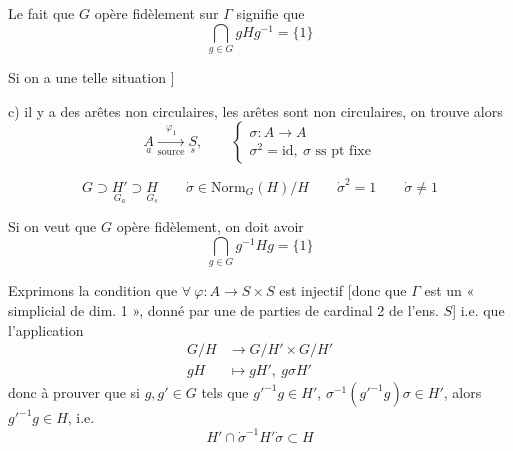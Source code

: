 \documentclass[11pt,a4paper]{article}
\begin{document}
Le fait que $G$ opère fidèlement sur $\Gamma$ signifie que
\[
\bigcap_{g \in G} g H g^{-1} = \{1\}
\]

Si on a une telle situation ]


c)  il y a des arêtes non circulaires, 
les arêtes sont non circulaires, on trouve alors
\[
\underset{a}{A} \xrightarrow[\text{source}]{\ \varphi_1\ } \underset{s}{S}, \qquad
\left\{
\begin{array}{l}
\sigma : A \to A \\
\sigma^2 = \mathrm{id},\ \sigma \text{ ss pt fixe}
\end{array}
\right.
\]

\[
\boxed{G \supset \underset{G_a}{H'} \supset \underset{G_s}{H} \qquad
\dot{\sigma} \in \mathrm{Norm}_G(H)/H \qquad \dot{\sigma}^2 = 1 \qquad
\dot{\sigma} \neq 1}
\]

Si on veut que $G$ opère fidèlement, on \struck{\ill{}} doit avoir
\[
\boxed{\bigcap_{g \in G} g^{-1} H g = \{1\}}
\]

Exprimons la condition que $\forall\ \varphi : A \to S \times S$ est
injectif [donc que $\Gamma$ est un «  simplicial de dim.
1 », donné par une  de parties de cardinal 2 de l'ens.
$S$] i.e. que l'application
\[
\begin{aligned}
G/H &\longrightarrow G/H' \times G/H' \\
gH &\longmapsto gH',\ g\sigma H'
\end{aligned}
\]
donc à prouver que si $g, g' \in G$ tels que $g'^{-1}g \in H'$,
$\sigma^{-1}(g'^{-1}g)\sigma \in H'$, alors \struck{\ill{}} $g'^{-1}g \in H$,
i.e.
\[
\boxed{H' \cap \dot{\sigma}^{-1} H' \dot{\sigma} \subset H}
\]

\end{document}
